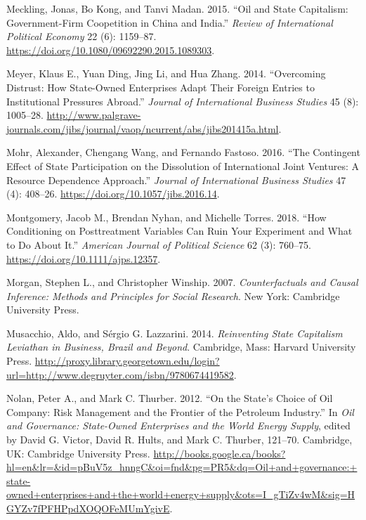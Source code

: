 \documentclass[11pt,]{book}
\begin{document}
\leavevmode\hypertarget{ref-meckling_oil_2015}{}%
Meckling, Jonas, Bo Kong, and Tanvi Madan. 2015. ``Oil and State Capitalism: Government-Firm Coopetition in China and India.'' \emph{Review of International Political Economy} 22 (6): 1159--87. \url{https://doi.org/10.1080/09692290.2015.1089303}.

\leavevmode\hypertarget{ref-meyer_overcoming_2014}{}%
Meyer, Klaus E., Yuan Ding, Jing Li, and Hua Zhang. 2014. ``Overcoming Distrust: How State-Owned Enterprises Adapt Their Foreign Entries to Institutional Pressures Abroad.'' \emph{Journal of International Business Studies} 45 (8): 1005--28. \url{http://www.palgrave-journals.com/jibs/journal/vaop/ncurrent/abs/jibs201415a.html}.

\leavevmode\hypertarget{ref-mohr_contingent_2016}{}%
Mohr, Alexander, Chengang Wang, and Fernando Fastoso. 2016. ``The Contingent Effect of State Participation on the Dissolution of International Joint Ventures: A Resource Dependence Approach.'' \emph{Journal of International Business Studies} 47 (4): 408--26. \url{https://doi.org/10.1057/jibs.2016.14}.

\leavevmode\hypertarget{ref-montgomery_how_2018}{}%
Montgomery, Jacob M., Brendan Nyhan, and Michelle Torres. 2018. ``How Conditioning on Posttreatment Variables Can Ruin Your Experiment and What to Do About It.'' \emph{American Journal of Political Science} 62 (3): 760--75. \url{https://doi.org/10.1111/ajps.12357}.

\leavevmode\hypertarget{ref-morgan_counterfactuals_2007}{}%
Morgan, Stephen L., and Christopher Winship. 2007. \emph{Counterfactuals and Causal Inference: Methods and Principles for Social Research}. New York: Cambridge University Press.

\leavevmode\hypertarget{ref-musacchio_reinventing_2014}{}%
Musacchio, Aldo, and Sérgio G. Lazzarini. 2014. \emph{Reinventing State Capitalism Leviathan in Business, Brazil and Beyond}. Cambridge, Mass: Harvard University Press. \url{http://proxy.library.georgetown.edu/login?url=http://www.degruyter.com/isbn/9780674419582}.

\leavevmode\hypertarget{ref-victor_states_2012}{}%
Nolan, Peter A., and Mark C. Thurber. 2012. ``On the State's Choice of Oil Company: Risk Management and the Frontier of the Petroleum Industry.'' In \emph{Oil and Governance: State-Owned Enterprises and the World Energy Supply}, edited by David G. Victor, David R. Hults, and Mark C. Thurber, 121--70. Cambridge, UK: Cambridge University Press. \url{http://books.google.ca/books?hl=en\&lr=\&id=pBuV5z_hnngC\&oi=fnd\&pg=PR5\&dq=Oil+and+governance:+state-owned+enterprises+and+the+world+energy+supply\&ots=I_gTiZv4wM\&sig=HGYZv7fPFHPpdXOQOFeMUmYgivE}.
\end{document}
